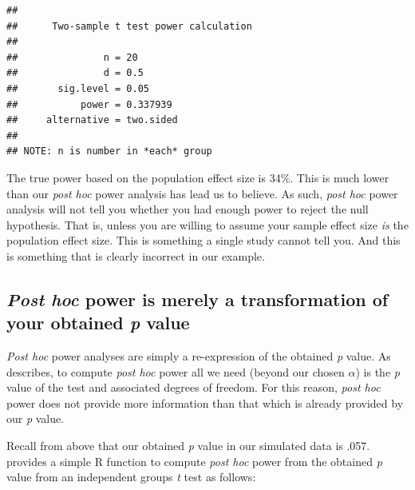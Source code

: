 \documentclass[
]{book}
\begin{document}
\begin{verbatim}
## 
##      Two-sample t test power calculation 
## 
##               n = 20
##               d = 0.5
##       sig.level = 0.05
##           power = 0.337939
##     alternative = two.sided
## 
## NOTE: n is number in *each* group
\end{verbatim}

The true power based on the population effect size is 34\%. This is much lower than our \emph{post hoc} power analysis has lead us to believe. As such, \emph{post hoc} power analysis will not tell you whether you had enough power to reject the null hypothesis. That is, unless you are willing to assume your sample effect size \emph{is} the population effect size. This is something a single study cannot tell you. And this is something that is clearly incorrect in our example.

\hypertarget{post-hoc-power-is-merely-a-transformation-of-your-obtained-p-value}{%
\subsection{\texorpdfstring{\emph{Post hoc} power is merely a transformation of your obtained \emph{p} value}{Post hoc power is merely a transformation of your obtained p value}}\label{post-hoc-power-is-merely-a-transformation-of-your-obtained-p-value}}

\emph{Post hoc} power analyses are simply a re-expression of the obtained \emph{p} value. As \citet{Lenth2007} describes, to compute \emph{post hoc} power all we need (beyond our chosen \(\alpha\)) is the \emph{p} value of the test and associated degrees of freedom. For this reason, \emph{post hoc} power does not provide more information than that which is already provided by our \emph{p} value.

Recall from above that our obtained \emph{p} value in our simulated data is .057. \citet{Lenth2007} provides a simple R function to compute \emph{post hoc} power from the obtained \emph{p} value from an independent groups \emph{t} test as follows:
\end{document}
